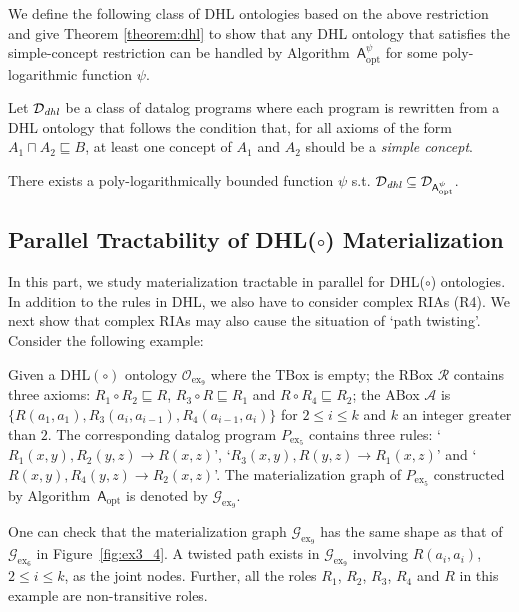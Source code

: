 We define the following class of DHL ontologies based on the above restriction and
give Theorem \ref{theorem:dhl} to show that any DHL ontology that satisfies the
simple-concept restriction can be handled by Algorithm~$\mathsf{A}^\psi_{\text{opt}}$
for some poly-logarithmic function $\psi$.

\begin{definition} Let $\mathcal{D}_{\textit{\text{dhl}}}$ be a class of datalog programs where
each program is rewritten from a DHL ontology that follows the condition that, for all axioms of the form
$A_1\sqcap A_2\sqsubseteq B$, at least one concept of $A_1$ and $A_2$ should be a \emph{simple concept}.
\end{definition}

\begin{theorem}\label{theorem:dhl}
There exists a poly-logarithmically bounded function $\psi$ s.t.
$\mathcal{D}_{\textit{\text{dhl}}}\subseteq\mathcal{D}_{\mathsf{A}_{\text{opt}}^{\psi}}$.
\end{theorem}


\subsection{Parallel Tractability of DHL($\circ$) Materialization}
\label{sec:DHLo}

In this part, we study materialization tractable in parallel for DHL($\circ$) ontologies.
In addition to the rules in DHL, we also have to consider complex RIAs (R4).
We next show that complex RIAs may also cause the situation of `path twisting'.
Consider the following example:
%
\begin{example}\label{exp:complexRIA}
Given a DHL$(\circ)$ ontology $\mathcal{O}_{\text{ex}_9}$ where the TBox is empty;
the RBox $\mathcal{R}$ contains three axioms:
$R_1\circ R_2\sqsubseteq R$, $R_3\circ R\sqsubseteq R_1$ and $R\circ R_4\sqsubseteq R_2$;
the ABox $\mathcal{A}$ is $\{R(a_1,a_1), R_3(a_i,a_{i-1}), R_4(a_{i-1},a_i)\}$
for $2\leq i\leq k$ and $k$ an integer greater than $2$.
The corresponding datalog program $P_{\text{ex}_5}$
contains three rules: `$R_1(x,y),R_2(y,z)\rightarrow R(x,z)$',
`$R_3(x,y),R(y,z)\rightarrow R_1(x,z)$' and `$R(x,y),R_4(y,z)\rightarrow R_2(x,z)$'.
The materialization graph of $P_{\text{ex}_5}$ constructed by Algorithm~$\mathsf{A}_{\text{opt}}$ is denoted by $\mathcal{G}_{\text{ex}_9}$.
\end{example}

One can check that the materialization graph $\mathcal{G}_{\text{ex}_9}$ has the same shape as that
of $\mathcal{G}_{\text{ex}_6}$ in Figure~\ref{fig:ex3_4}.
A twisted path exists in $\mathcal{G}_{\text{ex}_9}$ involving
$R(a_i,a_i)$, $2\leq i\leq k$, as the joint nodes.
Further, all the roles $R_1$, $R_2$, $R_3$, $R_4$ and $R$ in this example are non-transitive roles.

